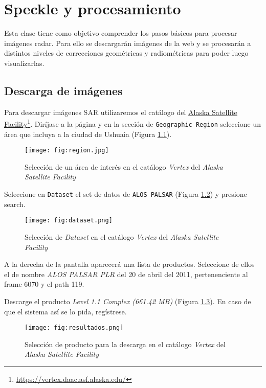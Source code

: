 \chapter{Speckle y procesamiento}

Esta clase tiene como objetivo comprender los pasos básicos para procesar imágenes radar. Para ello se descargarán imágenes de la web y se procesarán a distintos niveles de correcciones geométricas y radiométricas para poder luego visualizarlas.

\section{Descarga de imágenes}

Para descargar imágenes SAR utilizaremos el catálogo del \href{https://vertex.daac.asf.alaska.edu/}{Alaska Satellite Facility}\footnote{\href{https://vertex.daac.asf.alaska.edu/}{https://vertex.daac.asf.alaska.edu/}}. Diríjase a la página y en la sección de \texttt{Geographic Region} seleccione un área que incluya a la ciudad de Ushuaia (Figura \ref{fig:region}).

\begin{figure}[h!]
    \centering
    \texttt{[image: fig:region.jpg]}
    \caption{Selección de un área de interés en el catálogo \emph{Vertex} del \emph{Alaska Satellite Facility}}
    \label{fig:region}
\end{figure}

Seleccione en \texttt{Dataset} el set de datos de \texttt{ALOS PALSAR} (Figura \ref{fig:dataset}) y presione search.

\begin{figure}[h!]
    \centering
    \texttt{[image: fig:dataset.png]}
    \caption{Selección de \emph{Dataset} en el catálogo \emph{Vertex} del \emph{Alaska Satellite Facility}}
    \label{fig:dataset}
\end{figure}

A la derecha de la pantalla aparecerá una lista de productos. Seleccione de ellos el de nombre \emph{ALOS PALSAR PLR} del 20 de abril del 2011, pertenenciente al frame 6070 y el path 119.

Descarge el producto \emph{Level 1.1 Complex (661.42 MB)} (Figura \ref{fig:descarga}). En caso de que el sistema así se lo pida, regístrese.

\begin{figure}[h!]
    \centering
    \texttt{[image: fig:resultados.png]}
    \caption{Selección de producto para la descarga en el catálogo \emph{Vertex} del \emph{Alaska Satellite Facility}}
    \label{fig:descarga}
\end{figure}

